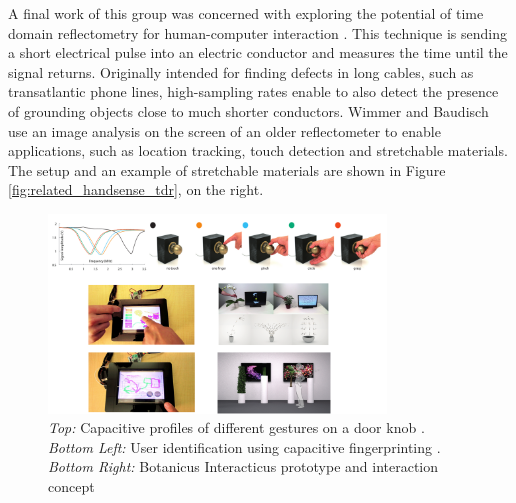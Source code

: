 A final work of this group was concerned with exploring the potential of time domain reflectometry for human-computer interaction \cite{wimmer2011modular}. This technique is sending a short electrical pulse into an electric conductor and measures the time until the signal returns. Originally intended for finding defects in long cables, such as transatlantic phone lines, high-sampling rates enable to also detect the presence of grounding objects close to much shorter conductors. Wimmer and Baudisch use an image analysis on the screen of an older reflectometer to enable applications, such as location tracking, touch detection and stretchable materials. The setup and an example of stretchable materials are shown in Figure \ref{fig:related_handsense_tdr}, on the right.
\begin{figure}[h]
\centering
\includegraphics[width=0.8\textwidth]{images/rel_cap_disney}
\caption{\emph{Top:} Capacitive profiles of different gestures on a door knob \cite{Sato2012}. \emph{Bottom Left:} User identification using capacitive fingerprinting \cite{harrison2012capacitive}. \emph{Bottom Right:} Botanicus Interacticus prototype and interaction concept \cite{poupyrev2012botanicus}} 
\label{fig:rel_cap_disney}
\end{figure}

